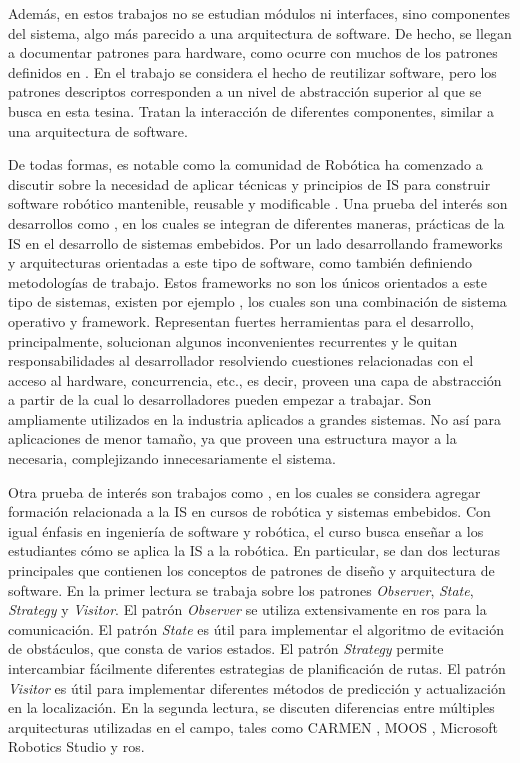 Además, en estos trabajos no se estudian módulos ni interfaces, sino componentes del sistema, algo más parecido a una arquitectura de software. De hecho, se llegan a documentar patrones para hardware, como ocurre con muchos de los patrones definidos en \cite{critical}. En el trabajo \cite{stable} se considera el hecho de reutilizar software, pero los patrones descriptos corresponden a un nivel de abstracción superior al que se busca en esta tesina. Tratan la interacción de diferentes componentes, similar a una arquitectura de software.

De todas formas, es notable como la comunidad de Robótica ha comenzado a discutir sobre la necesidad de aplicar técnicas y principios de IS para construir software robótico mantenible, reusable y modificable \cite{mejoras-1, mejoras-2}. Una prueba del interés son desarrollos como \cite{FernandezMadrigal2003, model,model1,model2,model3}, en los cuales se integran de diferentes maneras, prácticas de la IS en el desarrollo de sistemas embebidos. Por un lado desarrollando \glspl{framework} y arquitecturas orientadas a este tipo de software, como también definiendo metodologías de trabajo. Estos \glspl{framework} no son los únicos orientados a este tipo de sistemas, existen por ejemplo \cite{framework-1, framework-ros}, los cuales son una combinación de sistema operativo y framework. Representan fuertes herramientas para el desarrollo, principalmente, solucionan algunos inconvenientes recurrentes y le quitan responsabilidades al desarrollador resolviendo cuestiones relacionadas con el acceso al hardware, concurrencia, etc., es decir, proveen una capa de abstracción a partir de la cual lo desarrolladores pueden empezar a trabajar. Son ampliamente utilizados en la industria aplicados a grandes sistemas. No así para aplicaciones de menor tamaño, ya que proveen una estructura mayor a la necesaria, complejizando innecesariamente el sistema.

Otra prueba de interés son trabajos como \cite{Shin15fase}, en los cuales se considera agregar formación relacionada a la IS en cursos de robótica y sistemas embebidos. Con igual énfasis en ingeniería de software y robótica, el curso busca enseñar a los estudiantes cómo se aplica la IS a la robótica. En particular, se dan dos lecturas principales que contienen los conceptos de patrones de diseño y arquitectura de software. En la primer lectura se trabaja sobre los patrones \textit{Observer}, \textit{State}, \textit{Strategy} y \textit{Visitor}. El patrón \textit{Observer} se utiliza extensivamente en \gls{ros} para la comunicación. El patrón \textit{State} es útil para implementar el algoritmo de evitación de obstáculos, que consta de varios estados. El patrón \textit{Strategy} permite intercambiar fácilmente diferentes estrategias de planificación de rutas. El patrón \textit{Visitor} es útil para implementar diferentes métodos de predicción y actualización en la localización. En la segunda lectura, se discuten diferencias entre múltiples arquitecturas utilizadas en el campo, tales como CARMEN \cite{carmen}, MOOS \cite{moos}, Microsoft Robotics Studio \cite{microsoft} y \gls{ros}. 

